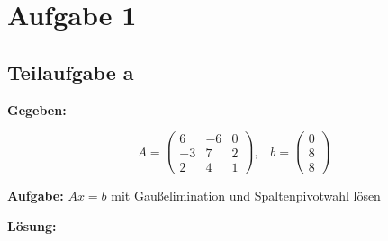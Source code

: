 \section*{Aufgabe 1}
\subsection*{Teilaufgabe a}
\textbf{Gegeben:}

\[A = 
\begin{pmatrix}
    6 & -6 & 0 \\
   -3 & 7  & 2  \\
    2 & 4  & 1
\end{pmatrix}, \;\;\;
b =\begin{pmatrix}
    0 \\
    8 \\
    8
\end{pmatrix}\]

\textbf{Aufgabe:} $Ax = b$ mit Gaußelimination und Spaltenpivotwahl lösen

\textbf{Lösung:} 


